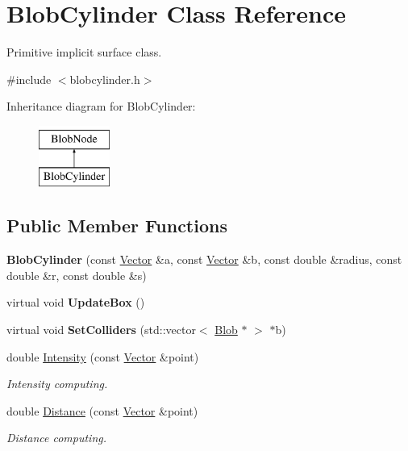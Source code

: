 \hypertarget{class_blob_cylinder}{
\section{BlobCylinder Class Reference}
\label{class_blob_cylinder}
}


Primitive implicit surface class.  




{\ttfamily \#include $<$blobcylinder.h$>$}

Inheritance diagram for BlobCylinder:\begin{figure}[H]
\begin{center}
\leavevmode
\includegraphics[height=2.000000cm]{class_blob_cylinder}
\end{center}
\end{figure}
\subsection*{Public Member Functions}
\begin{DoxyCompactItemize}
\item 
\hypertarget{class_blob_cylinder_a0a50880e90e3f3120386340d82d0ed90}{
{\bfseries BlobCylinder} (const \hyperlink{class_vector}{Vector} \&a, const \hyperlink{class_vector}{Vector} \&b, const double \&radius, const double \&r, const double \&s)}
\label{class_blob_cylinder_a0a50880e90e3f3120386340d82d0ed90}

\item 
\hypertarget{class_blob_cylinder_a97cb7363b5040a7bb54991ca892aca1c}{
virtual void {\bfseries UpdateBox} ()}
\label{class_blob_cylinder_a97cb7363b5040a7bb54991ca892aca1c}

\item 
\hypertarget{class_blob_cylinder_af757858bf76b74151b6a59d624960d3d}{
virtual void {\bfseries SetColliders} (std::vector$<$ \hyperlink{class_blob}{Blob} $\ast$ $>$ $\ast$b)}
\label{class_blob_cylinder_af757858bf76b74151b6a59d624960d3d}

\item 
double \hyperlink{class_blob_cylinder_aa1f8aad3a097e4562f2545ada6335739}{Intensity} (const \hyperlink{class_vector}{Vector} \&point)
\begin{DoxyCompactList}\small\item\em Intensity computing. \item\end{DoxyCompactList}\item 
double \hyperlink{class_blob_cylinder_a8fa31c8102fac1fc21ddd5aac21aa3be}{Distance} (const \hyperlink{class_vector}{Vector} \&point)
\begin{DoxyCompactList}\small\item\em Distance computing. \item\end{DoxyCompactList}\end{DoxyCompactItemize}


